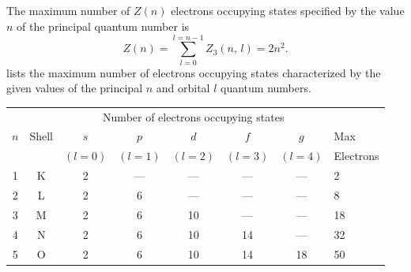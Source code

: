 \subsection{}\label{39.3.4} The maximum number of $Z(n)$ electrons occupying states specified by the value $n$ of the principal quantum number is
\begin{equation*}%
Z (n) = \sum_{l=0}^{l = n-1} Z_{3} ( n, \, l) = 2n^{2}.
\end{equation*}
 lists the maximum number of electrons occupying states characterized by the given values of the principal $n$ and orbital $l$ quantum numbers.

\begin{table}
\centering
\begin{small}
\begin{tabular}{c|cccccc|p{}}
\toprule
& & \multicolumn{5}{c|}{Number of electrons occupying states} & \\
$n$ & Shell & $s$ & $p$ & $d$ & $f$ & $g$ & Max \\
 & & $(l =0)$ & $ (l =1)$ & $ (l =2)$ & $ (l =3)$ & $(l =4)$ & Electrons \\
\midrule
1 & K & 2 & ---  & ---  & ---  & ---  & 2 \\
2 & L & 2 & 6 &  --- & ---  & ---  & 8 \\
3 & M & 2 & 6 & 10 &  --- & ---  & 18 \\
4 & N & 2 & 6 & 10 & 14 & ---  & 32 \\
5 & O & 2 & 6 & 10 & 14 & 18 & 50 \\
\bottomrule
\end{tabular}
\end{small}
\end{table}

